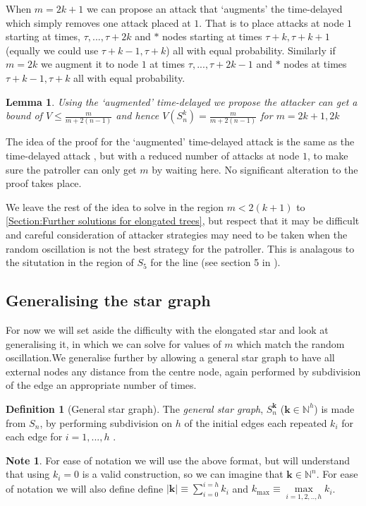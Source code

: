 \documentclass[a4paper,10pt]{article}
\newtheorem{lemma}[theorem]{Lemma}
\theoremstyle{definition}
\newtheorem{definition}[theorem]{Definition}
\theoremstyle{definition}
\theoremstyle{remark}
\theoremstyle{definition}
\newtheorem*{note}{Note}
\begin{document}
When $m=2k+1$ we can propose an attack that `augments' the time-delayed which simply removes one attack placed at $1$. That is to place attacks at node $1$ starting at times, $\tau,...,\tau+2k$ and $*$ nodes starting at times $\tau+k,\tau+k+1$ (equally we could use $\tau+k-1,\tau+k$) all with equal probability. Similarly if $m=2k$ we augment it to node $1$ at times $\tau,...,\tau+2k-1$ and $*$ nodes at times $\tau+k-1,\tau+k$ all with equal probability.

\begin{lemma}
Using the `augmented' time-delayed we propose the attacker can get a bound of $V \leq \frac{m}{m+2(n-1)}$ and hence $V(S_{n}^{k})=\frac{m}{m+2(n-1)}$ for $m=2k+1,2k$
\end{lemma}

The idea of the proof for the `augmented' time-delayed attack is the same as the time-delayed attack , but with a reduced number of attacks at node $1$, to make sure the patroller can only get $m$ by waiting here. No significant alteration to the proof takes place.

We leave the rest of the idea to solve in the region $m < 2(k+1)$ to \ref{Section:Further solutions for elongated trees}, but respect that it may be difficult and careful consideration of attacker strategies may need to be taken when the random oscillation is not the best strategy for the patroller. This is analagous to the situtation in the region of $S_{5}$ for the line (see section 5 in \cite{Lin2013}).

\subsection{Generalising the star graph}
For now we will set aside the difficulty with the elongated star and look at generalising it, in which we can solve for values of $m$ which match the random oscillation.We generalise further by allowing a general star graph to have all external nodes any distance from the centre node, again performed by subdivision of the edge an appropriate number of times.

\begin{definition}[General star graph]
The \textit{general star graph}, $S^{\bm{k}}_{n}$ ($\bm{k} \in \mathbb{N}^{h}$) is made from $S_{n}$, by performing subdivision on $h$ of the  initial edges each repeated $k_{i}$ for each edge for $i=1,...,h$ . 
\end{definition}

\begin{note}
For ease of notation we will use the above format, but will understand that using $k_{i}=0$ is a valid construction, so we can imagine that $\bm{k} \in \mathbb{N}^n$.
For ease of notation we will also define define $ |\bm{k}| \equiv \sum\limits_{i=0}^{i=h} k_{i}$ and $ k_{\max} \equiv \max\limits_{i=1,2,..,h} k_{i}$.
\end{note}
\end{document}
